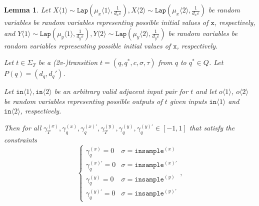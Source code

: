 \documentclass[12pt]{article}
\newcommand{\brangle}[1]{\langle #1 \rangle}
\newcommand{\Lap}{\texttt{Lap}}
\newtheorem{lemma}[thm]{Lemma}
\theoremstyle{definition}
\begin{document}
\begin{lemma}\label{mvIndTransitionCoupling}
    Let $X\brangle{1}\sim \Lap(\mu_x\brangle{1}, \frac{1}{d_x\varepsilon}), X\brangle{2}\sim\Lap(\mu_x\brangle{2}, \frac{1}{d_x\varepsilon})$ be random variables be random variables representing possible initial values of $\texttt{x}$, respectively, and $Y\brangle{1}\sim \Lap(\mu_y\brangle{1}, \frac{1}{d_y\varepsilon}), Y\brangle{2}\sim\Lap(\mu_y\brangle{2}, \frac{1}{d_y\varepsilon})$ be random variables be random variables representing possible initial values of $\texttt{x}$, respectively. 

    Let $t\in \Sigma_T$ be a  (2v-)transition $t = (q, q^*, c, \sigma, \tau)$ from $q$ to $q^*\in Q$. Let $P(q) = (d_q, d_q')$.

    Let $\texttt{in}\brangle{1}, \texttt{in}\brangle{2}$ be an arbitrary valid adjacent input pair for $t$ and let $o\brangle{1}$, $o\brangle{2}$ be random variables representing possible outputs of $t$ given inputs $\texttt{in}\brangle{1}$ and $\texttt{in}\brangle{2}$, respectively. 

    Then for all $\gamma_T^{(x)}, \gamma_q^{(x)}, \gamma_q^{(x)\prime},\gamma_T^{(y)}, \gamma_q^{(y)}, \gamma_q^{(y)\prime} \in [-1, 1]$ that satisfy the constraints \[
        \begin{cases}
          \gamma_q^{(x)}=0 & \sigma = \texttt{insample}^{(x)}\\
          \gamma_q^{(x)\prime}=0 & \sigma = \texttt{insample}^{(x)\prime}\\
          \gamma_q^{(y)}=0 & \sigma = \texttt{insample}^{(y)}\\
          \gamma_q^{(y)\prime}=0 & \sigma = \texttt{insample}^{(y)\prime}
        \end{cases},
      \]


\end{lemma}
\end{document}
